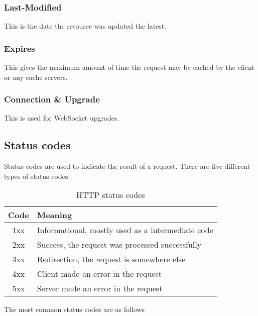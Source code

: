 \subsubsection{Last-Modified}
This is the date the resource was updated the latest.

\subsubsection{Expires}
This gives the maximum amount of time the request may be cached by the client or any cache servers.

\subsubsection{Connection \& Upgrade}
This is used for WebSocket upgrades.

\subsection{Status codes}
Status codes are used to indicate the result of a request.
There are five different types of status codes.

\begin{table}[h]
	\centering
	\begin{tabular} {c | l}
		Code & Meaning                                           \\
		\hline
		1xx  & Informational, mostly used as a intermediate code \\
		2xx  & Success, the request was processed successfully   \\
		3xx  & Redirection, the request is somewhere else        \\
		4xx  & Client made an error in the request               \\
		5xx  & Server made an error in the request               \\
	\end{tabular}
	\caption{HTTP status codes}
\end{table}

The most common status codes are as follows

